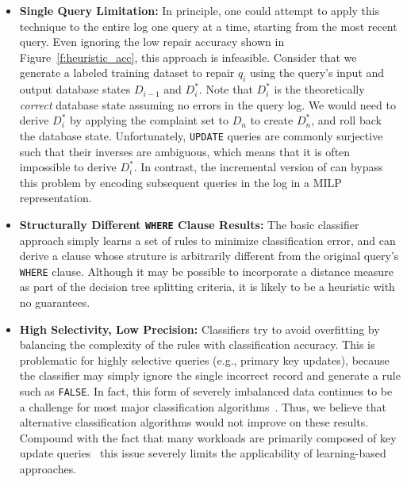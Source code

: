 \begin{itemize}[itemsep=1pt, leftmargin=5mm]
\item \textbf{Single Query Limitation: }
In principle, one could attempt to apply this technique to the
entire log one query at a time, starting from the most recent query.
Even ignoring the low repair accuracy shown in Figure~\ref{f:heuristic_acc},
this approach is infeasible.
Consider that we generate a labeled training dataset to repair $q_i$ 
using the query's input and output database states $D_{i-1}$ and $D_i^*$.
Note that $D_i^*$ is the theoretically \emph{correct} database state assuming no errors in the query log.
We would need to derive $D_i^*$ by applying the complaint set to $D_n$ to create $D_n^*$, and roll back the database state.
Unfortunately, \texttt{UPDATE} queries are commonly surjective such
that their inverses are ambiguous, which means that it is often
impossible to derive $D_i^*$. In contrast, the incremental version of
\sys can bypass this problem by encoding subsequent queries in the log
in a MILP representation.


\item \textbf{Structurally Different \texttt{WHERE} Clause Results: } 
The basic classifier approach simply learns a set of rules to minimize
classification error, and can derive a clause whose struture is arbitrarily 
different from the original query's \texttt{WHERE} clause.
Although it may be possible to incorporate a distance measure as part of the decision tree
splitting criteria, it is likely to be a heuristic with no guarantees.


\item \textbf{High Selectivity, Low Precision: }
Classifiers try to avoid overfitting by balancing the complexity of the rules with classification accuracy.
This is problematic for highly selective queries (e.g., primary key updates), because the classifier
may simply ignore the single incorrect record and generate a rule such as \texttt{FALSE}.
In fact, this form of severely imbalanced data continues to be a challenge for most major classification algorithms~\cite{he2009learning, galar2012review}. 
Thus, we believe that alternative classification algorithms would not improve on these results. 
Compound with the fact that many workloads are primarily composed of
key update queries~\cite{oltpbench} this issue severely limits the
applicability of learning-based approaches.

\end{itemize}








